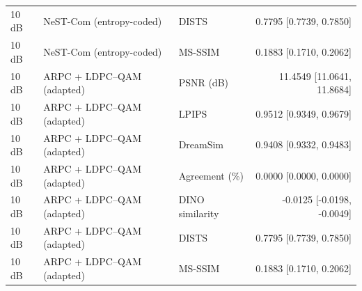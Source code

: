 \begin{table}[t]
\begin{tabular}{lllr}
10 dB & NeST-Com (entropy-coded) & DISTS & 0.7795 [0.7739, 0.7850] \\
10 dB & NeST-Com (entropy-coded) & MS-SSIM & 0.1883 [0.1710, 0.2062] \\
10 dB & ARPC + LDPC--QAM (adapted) & PSNR (dB) & 11.4549 [11.0641, 11.8684] \\
10 dB & ARPC + LDPC--QAM (adapted) & LPIPS & 0.9512 [0.9349, 0.9679] \\
10 dB & ARPC + LDPC--QAM (adapted) & DreamSim & 0.9408 [0.9332, 0.9483] \\
10 dB & ARPC + LDPC--QAM (adapted) & Agreement (\%) & 0.0000 [0.0000, 0.0000] \\
10 dB & ARPC + LDPC--QAM (adapted) & DINO similarity & -0.0125 [-0.0198, -0.0049] \\
10 dB & ARPC + LDPC--QAM (adapted) & DISTS & 0.7795 [0.7739, 0.7850] \\
10 dB & ARPC + LDPC--QAM (adapted) & MS-SSIM & 0.1883 [0.1710, 0.2062] \\
\bottomrule
\end{tabular}
\end{table}
